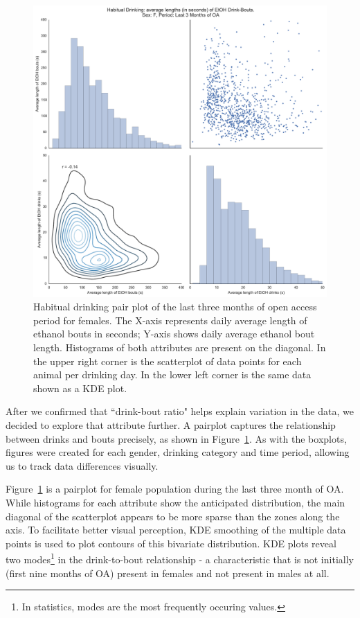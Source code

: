 	\begin{figure}[ht]
		\centering
		\includegraphics[width=0.85\linewidth]{figures/habitual_f_l3mo.pdf}
		\caption{Habitual drinking pair plot of the last three months of open access period for females. The X-axis represents daily average length of ethanol bouts in seconds; Y-axis shows daily average ethanol bout length. Histograms of both attributes are present on the diagonal. In the upper right corner is the scatterplot of data points for each animal per drinking day. In the lower left corner is the same data shown as a KDE plot.}
		\label{fig:habitual-l3mo-f}
	\end{figure}
	
	After we confirmed that ``drink-bout ratio" helps explain variation in the data, we decided to explore that attribute further. A pairplot captures the relationship between drinks and bouts precisely, as shown in Figure~\ref{fig:habitual-l3mo-f}. As with the boxplots, figures were created for each gender, drinking category and time period, allowing us to track data differences visually.  
	
	Figure~\ref{fig:habitual-l3mo-f} is a pairplot for female population during the last three month of OA. While histograms for each attribute show the anticipated distribution, the main diagonal of the scatterplot appears to be more sparse than the zones along the axis. To facilitate better visual perception, KDE smoothing of the multiple data points is used to plot contours of this bivariate distribution. KDE plots reveal two modes\footnote{In statistics, modes are the most frequently occuring values.} in the drink-to-bout relationship - a characteristic that is not initially (first nine months of OA) present in females and not present in males at all. 	


